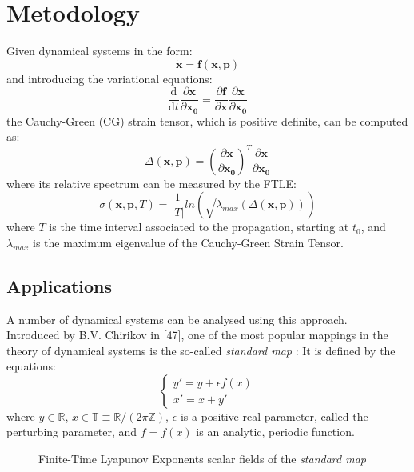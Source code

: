 \documentclass{juliacon}
\newcommand{\drv}{\textrm{d}}
\begin{document}
\section{Metodology}
Given dynamical systems in the form:
\begin{equation}
    \dot{\mathbf{x}}=\mathbf{f}(\mathbf{x}, \mathbf{p})
\end{equation}
and introducing the variational equations:
\begin{equation}
    \frac{\drv}{\drv t} \frac{\partial \mathbf{x} }{\partial \mathbf{x_0}} = \frac{\partial \mathbf{f}}{\partial \mathbf{x}}\frac{\partial \mathbf{x}}{\partial \mathbf{x_0}}
\end{equation}
the Cauchy-Green (CG) strain tensor, which is positive definite, can be computed as:
\begin{equation}
    \Delta(\mathbf{x}, \mathbf{p}) = \left( \frac{\partial \mathbf{x}}{\partial \mathbf{x_0}}\right)^T \frac{\partial \mathbf{x}}{\partial \mathbf{x_0}}
\end{equation}
where its relative spectrum can be measured by the FTLE:
\begin{equation}
    \sigma(\mathbf{x}, \mathbf{p}, T)=\frac{1}{|T|}ln(\sqrt{\lambda_{max}(\Delta(\mathbf{x}, \mathbf{p}))})
\end{equation}
where $T$ is the time interval associated to the propagation, starting at $t_0$, and $\lambda_{max}$ is the maximum eigenvalue of the Cauchy-Green Strain Tensor.

\subsection{Applications}
A number of dynamical systems can be analysed using this approach. \\
Introduced by B.V. Chirikov in [47], one of the most popular mappings in the theory of dynamical systems is the so-called \emph{standard map} \cite{celletti}:
It is defined by the equations:
\begin{equation}
    \begin{cases}
    y'=y+\epsilon f(x) \\
    x'=x+y'
\end{cases}
\end{equation}
where $y\in\mathbb{R}$, $x\in\mathbb{T}\equiv \mathbb{R}/(2\pi\mathbb{Z})$, $\epsilon$ is a positive real parameter, called the perturbing parameter, and $f = f(x)$ is an analytic, periodic function.
\begin{figure}[h]
    \centering
    \caption{Finite-Time Lyapunov Exponents scalar fields of the \emph{standard map}}
    \label{fig:stdmap}
\end{figure}
\end{document}
